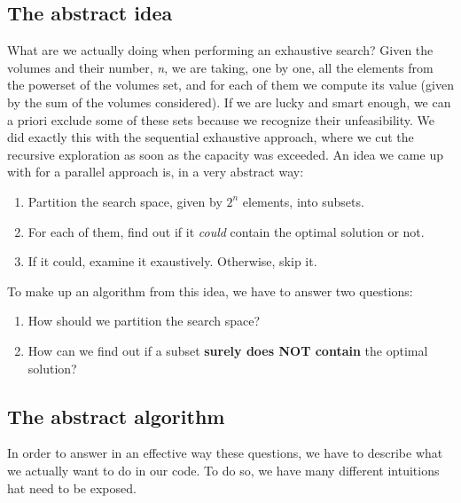 \documentclass[12pt]{extarticle}
\begin{document}
\subsection{The abstract idea}
What are we actually doing when performing an exhaustive search? Given the volumes and their number, \emph{n}, we are taking, one by one, all the elements from the powerset of the volumes set, and for each of them we compute its value (given by the sum of the volumes considered). If we are lucky and smart enough, we can a priori exclude some of these sets because we recognize their unfeasibility. We did exactly this with the sequential exhaustive approach, where we cut the recursive exploration as soon as the capacity was exceeded.\newline
An idea we came up with for a parallel approach is, in a very abstract way:
\begin{enumerate}
    \item Partition the search space, given by $2^{n}$ elements, into subsets.
    \item For each of them, find out if it \emph{could} contain the optimal solution or not.
    \item If it could, examine it exaustively. Otherwise, skip it.
\end{enumerate}
To make up an algorithm from this idea, we have to answer two questions:
\begin{enumerate}
    \item How should we partition the search space?
    \item How can we find out if a subset \textbf{surely does NOT contain} the optimal solution?
\end{enumerate}
\subsection{The abstract algorithm}
In order to answer in an effective way these questions, we have to describe what we actually want to do in our code. To do so, we have many different intuitions hat need to be exposed.
\end{document}
